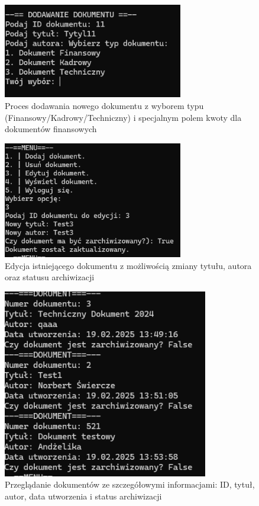 \begin{figure}[htbp]
  \centering
  \includegraphics[width=0.7\textwidth]{dodawanie.png}
  \caption{Proces dodawania nowego dokumentu z wyborem typu (Finansowy/Kadrowy/Techniczny) i specjalnym polem kwoty dla dokumentów finansowych}
  \label{fig:dodawanie}
\end{figure}

\begin{figure}[htbp]
  \centering
  \includegraphics[width=0.7\textwidth]{edytuj.png}
  \caption{Edycja istniejącego dokumentu z możliwością zmiany tytułu, autora oraz statusu archiwizacji}
  \label{fig:edycja}
\end{figure}

\begin{figure}[htbp]
  \centering
  \includegraphics[width=0.8\textwidth]{wyswietl.png}
  \caption{Przeglądanie dokumentów ze szczegółowymi informacjami: ID, tytuł, autor, data utworzenia i status archiwizacji}
  \label{fig:przegladanie}
\end{figure}

